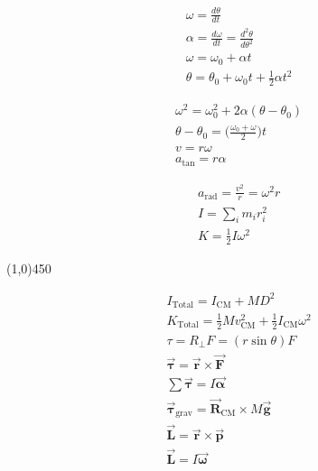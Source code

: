 \documentclass[9pt,letterpaper]{article}
\newcommand{\vect}[1]{\vec{\boldsymbol{#1}}}
\begin{document}
\begin{minipage}[t]{0.3\linewidth}
    \vspace{0.1in}
\begin{align*}
&\omega = \frac{d\theta}{dt}\\
&\alpha = \frac{d\omega}{dt} = \frac{d^{2}\theta}{d\theta^{2}}\\
&\omega = \omega_{0}+\alpha t\\
&\theta=\theta_{0}+\omega_{0}t+\frac{1}{2}\alpha t^{2}
\end{align*}
\end{minipage}
\begin{minipage}[t]{0.3\linewidth}
\begin{align*}
&\omega^{2}=\omega_{0}^{2}+2\alpha(\theta-\theta_{0})\\
&\theta-\theta_{0}=\biggl(\frac{\omega_{0}+\omega}{2}\biggr)t\\
&v=r\omega\\
&a_{\text{tan}} = r\alpha
\end{align*}
\end{minipage}
\begin{minipage}[t]{0.3\linewidth}
\begin{align*}
&a_{\text{rad}} = \frac{v^{2}}{r}=\omega^{2}r\\
&I = \sum_{i}m_{i}r^{2}_{i}\\
&K=\frac{1}{2}I\omega^{2}
\end{align*}
\end{minipage}
\begin{center}
\line(1,0){450}
\end{center}
\vspace{-0.3in}
\hspace{0.6in}
\begin{minipage}[t]{0.25\linewidth}
\begin{align*}
&I_{\text{Total}} =I_{\text{CM}}+MD^{2}\\
&K_{\text{Total}} = \frac{1}{2}Mv_{\text{CM}}^{2} + \frac{1}{2}I_{\text{CM}}\omega^{2}\\
&\tau =R_{\perp}F = (r\sin{\theta})F\\
&\vect{\tau} = \vect{r}\times \vect{F}\\
&\sum \vect{\tau} = I \vect{\alpha}\\
&\vect{\tau}_{\text{grav}} = \vect{R}_{\text{CM}}\times M\vect{g}\\
&\vect{L}=\vect{r}\times \vect{p}\\
&\vect{L}=I\vect{\omega}
\end{align*}
\end{minipage}
\end{document}

